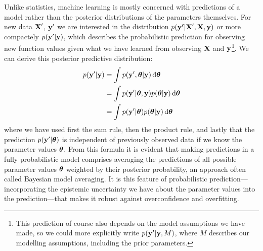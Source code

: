 \documentclass[../thesis.tex]{subfiles}
\begin{document}
Unlike statistics, machine learning is mostly concerned with predictions of a model rather than the posterior distributions of the parameters themselves. For new data $\boldsymbol{\mathbf{X}}'$, $\boldsymbol{\mathbf{y}}'$ we are interested in the distribution $p(\boldsymbol{\mathbf{y'}} | \boldsymbol{\mathbf{X}}', \boldsymbol{\mathbf{X}}, \boldsymbol{\mathbf{y}})$ or more compactely $p(\boldsymbol{\mathbf{y}}' | \boldsymbol{\mathbf{y}})$, which describes the probabilistic prediction for observing new function values given what we have learned from observing $\boldsymbol{\mathbf{X}}$ and $\boldsymbol{\mathbf{y}}$\footnote{This prediction of course also depends on the model assumptions we have made, so we could more explicitly write $p(\boldsymbol{\mathbf{y'}} | \boldsymbol{\mathbf{y}}, M)$, where $M$ describes our modelling assumptions, including the prior parameters.}. We can derive this posterior predictive distribution:
\begin{equation}
    \begin{split}
        p(\boldsymbol{\mathbf{y}}' | \boldsymbol{\mathbf{y}}) &= \int p(\boldsymbol{\mathbf{y}}', \boldsymbol{\mathbf{\theta}} | \boldsymbol{\mathbf{y}}) \mathop{}\!\mathrm{d} \boldsymbol{\mathbf{\theta}} \\
        &=\int p(\boldsymbol{\mathbf{y}}' | \boldsymbol{\mathbf{\theta}}, \boldsymbol{\mathbf{y}}) p(\boldsymbol{\mathbf{\theta}} | \boldsymbol{\mathbf{y}}) \mathop{}\!\mathrm{d}\boldsymbol{\mathbf{\theta}} \\
        &= \int p(\boldsymbol{\mathbf{y}}' | \boldsymbol{\mathbf{\theta}}) p(\boldsymbol{\mathbf{\theta}} | \boldsymbol{\mathbf{y}}) \mathop{}\!\mathrm{d}\boldsymbol{\mathbf{\theta}}
    \end{split}
\end{equation}
where we have used first the sum rule, then the product rule, and lastly that the prediction $p(\boldsymbol{\mathbf{y}}' | \boldsymbol{\mathbf{\theta}})$ is independent of previously observed data if we know the parameter values $\boldsymbol{\mathbf{\theta}}$. From this formula it is evident that making predictions in a fully probabilistic model comprises averaging the predictions of all possible parameter values $\boldsymbol{\mathbf{\theta}}$ weighted by their posterior probability, an approach often called Bayesian model averaging. It is this feature of probabilistic prediction---incorporating the epistemic uncertainty we have about the parameter values into the prediction---that makes it robust against overconfidence and overfitting. 
\end{document}
